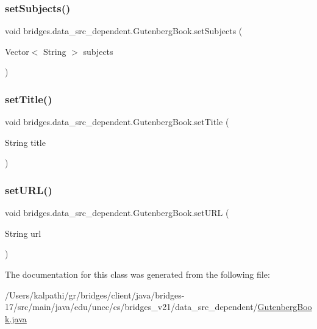 \subsubsection{\texorpdfstring{set\+Subjects()}{setSubjects()}}
{\footnotesize\ttfamily void bridges.\+data\+\_\+src\+\_\+dependent.\+Gutenberg\+Book.\+set\+Subjects (\begin{DoxyParamCaption}\item[{Vector$<$ String $>$}]{subjects }\end{DoxyParamCaption})}

\mbox{\label{classbridges_1_1data__src__dependent_1_1_gutenberg_book_a1f4b11121296e76e4d5afc86157b52d4}} 
\subsubsection{\texorpdfstring{set\+Title()}{setTitle()}}
{\footnotesize\ttfamily void bridges.\+data\+\_\+src\+\_\+dependent.\+Gutenberg\+Book.\+set\+Title (\begin{DoxyParamCaption}\item[{String}]{title }\end{DoxyParamCaption})}

\mbox{\label{classbridges_1_1data__src__dependent_1_1_gutenberg_book_a9069f9c6835df30ccabf179158b9aa18}} 
\subsubsection{\texorpdfstring{set\+U\+R\+L()}{setURL()}}
{\footnotesize\ttfamily void bridges.\+data\+\_\+src\+\_\+dependent.\+Gutenberg\+Book.\+set\+U\+RL (\begin{DoxyParamCaption}\item[{String}]{url }\end{DoxyParamCaption})}



The documentation for this class was generated from the following file\+:\begin{DoxyCompactItemize}
\item 
/\+Users/kalpathi/gr/bridges/client/java/bridges-\/17/src/main/java/edu/uncc/cs/bridges\+\_\+v21/data\+\_\+src\+\_\+dependent/\mbox{\hyperlink{_gutenberg_book_8java}{Gutenberg\+Book.\+java}}\end{DoxyCompactItemize}
